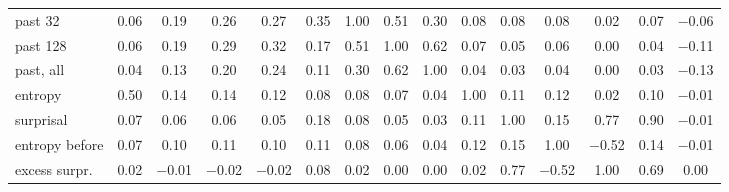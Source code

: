 \begin{table}[H]
\begin{tabular}{lcccccccccccccc}
    past 32 & \cellcolor{red!4}0.06 & \cellcolor{red!12}0.19 & \cellcolor{red!16}0.26 & \cellcolor{red!16}0.27 & \cellcolor{red!21}0.35 & \cellcolor{red!60}1.00 & \cellcolor{red!31}0.51 & \cellcolor{red!18}0.30 & \cellcolor{red!5}0.08 & \cellcolor{red!5}0.08 & \cellcolor{red!5}0.08 & \cellcolor{red!1}0.02 & \cellcolor{red!4}0.07 & \cellcolor{blue!4}$-$0.06 \\
    past 128 & \cellcolor{red!3}0.06 & \cellcolor{red!12}0.19 & \cellcolor{red!17}0.29 & \cellcolor{red!19}0.32 & \cellcolor{red!10}0.17 & \cellcolor{red!31}0.51 & \cellcolor{red!60}1.00 & \cellcolor{red!37}0.62 & \cellcolor{red!4}0.07 & \cellcolor{red!3}0.05 & \cellcolor{red!4}0.06 & \cellcolor{red!0}0.00 & \cellcolor{red!3}0.04 & \cellcolor{blue!7}$-$0.11 \\
    past, all & \cellcolor{red!2}0.04 & \cellcolor{red!8}0.13 & \cellcolor{red!12}0.20 & \cellcolor{red!14}0.24 & \cellcolor{red!6}0.11 & \cellcolor{red!18}0.30 & \cellcolor{red!37}0.62 & \cellcolor{red!60}1.00 & \cellcolor{red!3}0.04 & \cellcolor{red!2}0.03 & \cellcolor{red!2}0.04 & \cellcolor{red!0}0.00 & \cellcolor{red!2}0.03 & \cellcolor{blue!8}$-$0.13 \\
    entropy & \cellcolor{red!30}0.50 & \cellcolor{red!8}0.14 & \cellcolor{red!8}0.14 & \cellcolor{red!7}0.12 & \cellcolor{red!5}0.08 & \cellcolor{red!5}0.08 & \cellcolor{red!4}0.07 & \cellcolor{red!3}0.04 & \cellcolor{red!60}1.00 & \cellcolor{red!7}0.11 & \cellcolor{red!7}0.12 & \cellcolor{red!1}0.02 & \cellcolor{red!6}0.10 & \cellcolor{blue!1}$-$0.01 \\
    surprisal & \cellcolor{red!4}0.07 & \cellcolor{red!4}0.06 & \cellcolor{red!4}0.06 & \cellcolor{red!3}0.05 & \cellcolor{red!11}0.18 & \cellcolor{red!5}0.08 & \cellcolor{red!3}0.05 & \cellcolor{red!2}0.03 & \cellcolor{red!7}0.11 & \cellcolor{red!60}1.00 & \cellcolor{red!9}0.15 & \cellcolor{red!46}0.77 & \cellcolor{red!54}0.90 & \cellcolor{blue!1}$-$0.01 \\
    entropy before & \cellcolor{red!4}0.07 & \cellcolor{red!6}0.10 & \cellcolor{red!7}0.11 & \cellcolor{red!6}0.10 & \cellcolor{red!7}0.11 & \cellcolor{red!5}0.08 & \cellcolor{red!4}0.06 & \cellcolor{red!2}0.04 & \cellcolor{red!7}0.12 & \cellcolor{red!9}0.15 & \cellcolor{red!60}1.00 & \cellcolor{blue!31}$-$0.52 & \cellcolor{red!8}0.14 & \cellcolor{blue!1}$-$0.01 \\
    excess surpr. & \cellcolor{red!1}0.02 & \cellcolor{blue!1}$-$0.01 & \cellcolor{blue!1}$-$0.02 & \cellcolor{blue!1}$-$0.02 & \cellcolor{red!5}0.08 & \cellcolor{red!1}0.02 & \cellcolor{red!0}0.00 & \cellcolor{red!0}0.00 & \cellcolor{red!1}0.02 & \cellcolor{red!46}0.77 & \cellcolor{blue!31}$-$0.52 & \cellcolor{red!60}1.00 & \cellcolor{red!41}0.69 & \cellcolor{blue!0}0.00 \\

\end{tabular}
\end{table}
